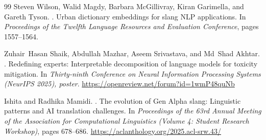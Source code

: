 \documentclass{article}
\begin{document}
\begin{thebibliography}{99}
Steven Wilson, Walid Magdy, Barbara McGillivray, Kiran Garimella, and Gareth
Tyson.
.
\newblock Urban dictionary embeddings for slang NLP applications.
\newblock In \emph{Proceedings of the Twelfth Language Resources and Evaluation
Conference}, pages 1557--1564.

Zuhair~Hasan Shaik, Abdullah Mazhar, Aseem Srivastava, and Md~Shad Akhtar.
.
\newblock Redefining experts: Interpretable decomposition of language models for toxicity mitigation.
\newblock In \emph{Thirty-ninth Conference on Neural Information Processing Systems (NeurIPS 2025), poster}.
\newblock \url{https://openreview.net/forum?id=1wmP48quNb}

Ishita and Radhika Mamidi.
.
\newblock The evolution of Gen Alpha slang: Linguistic patterns and {AI} translation challenges.
\newblock In \emph{Proceedings of the 63rd Annual Meeting of the Association for Computational Linguistics (Volume 4: Student Research Workshop)}, pages 678--686.
\newblock \url{https://aclanthology.org/2025.acl-srw.43/}

\end{thebibliography}

\appendix
\end{document}
